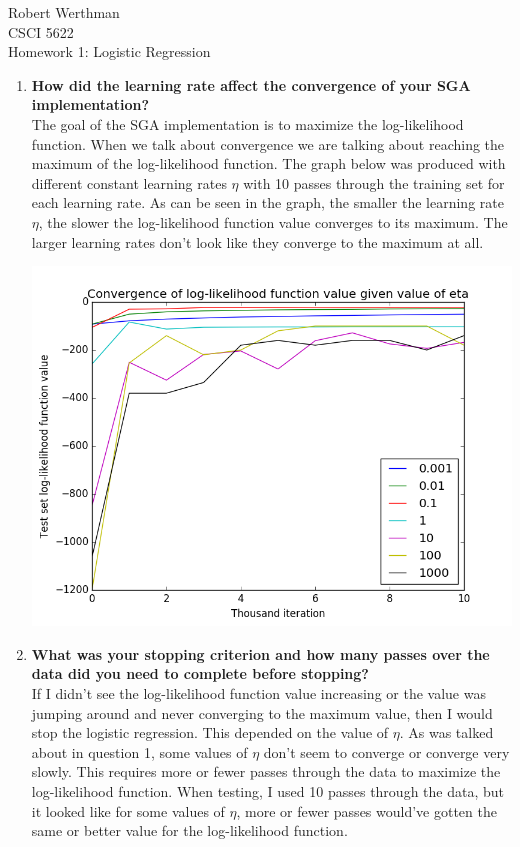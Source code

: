 \documentclass[8pt]{article}
\begin{document}
\noindent
Robert Werthman\\
CSCI 5622\\
Homework 1: Logistic Regression\\

\begin{enumerate}
\item \textbf{How did the learning rate affect the convergence of your SGA implementation?}\\
The goal of the SGA implementation is to maximize the log-likelihood function.  When we talk about convergence we are talking about reaching the maximum of the log-likelihood function.  The graph below was produced with different constant learning rates $\eta$ with 10 passes through the training set for each learning rate.  As can be seen in the graph, the smaller the learning rate $\eta$, the slower the log-likelihood function value converges to its maximum.  The larger learning rates don't look like they converge to the maximum at all.\\
\begin{center}
\includegraphics[scale=.3]{q1.png}
\end{center}
\item \textbf{What was your stopping criterion and how many passes over the data did you need to complete before stopping?}\\
If I didn't see the log-likelihood function value increasing or the value was jumping around and never converging to the maximum value, then I would stop the logistic regression.  This depended on the value of $\eta$.  As was talked about in question 1, some values of $\eta$ don't seem to converge or converge very slowly.  This requires more or fewer passes through the data to maximize the log-likelihood function.  When testing, I used 10 passes through the data, but it looked like for some values of $\eta$, more or fewer passes would've gotten the same or better value for the log-likelihood function.  


\end{enumerate}
\end{document}
